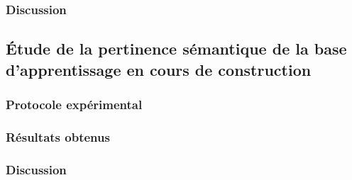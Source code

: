 		\subsubsection{Discussion}
	
	\subsection{Étude de la pertinence sémantique de la base d'apprentissage en cours de construction}
	
		\subsubsection{Protocole expérimental}

		\subsubsection{Résultats obtenus}

		\subsubsection{Discussion}